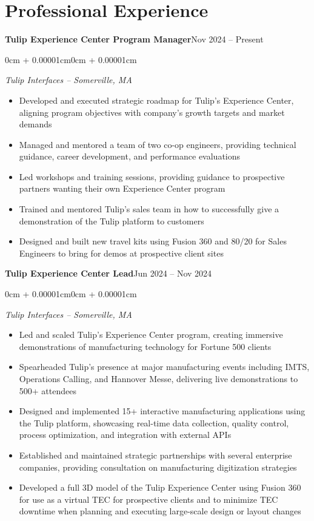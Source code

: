 \documentclass[10pt, letterpaper]{article}
\newenvironment{highlights}{
    \begin{itemize}[
        leftmargin=0.5cm,
        rightmargin=0cm,
        itemindent=0cm,
        labelwidth=0.3cm,
        labelsep=0.2cm,
        align=left,
        itemsep=0.05cm,
        topsep=0.05cm,
        parsep=0.05cm,
        partopsep=0pt
    ]
}{
    \end{itemize}
    \vspace{0.1cm}
}
\newenvironment{onecolentry}{
    \begin{adjustwidth}{0cm + 0.00001cm}{0cm + 0.00001cm}
}{
    \end{adjustwidth}
}
\begin{document}
    \section{Professional Experience}
    \begin{twocolentry}{\textbf{Tulip Experience Center Program Manager}}{Nov 2024 -- Present}
    \end{twocolentry}
    \begin{onecolentry}
    \textit{Tulip Interfaces -- Somerville, MA}
    \begin{highlights}
        \item Developed and executed strategic roadmap for Tulip's Experience Center, aligning program objectives with company's growth targets and market demands
        \item Managed and mentored a team of two co-op engineers, providing technical guidance, career development, and performance evaluations
        \item Led workshops and training sessions, providing guidance to prospective partners wanting their own Experience Center program
        \item Trained and mentored Tulip's sales team in how to successfully give a demonstration of the Tulip platform to customers
        \item Designed and built new travel kits using Fusion 360 and 80/20 for Sales Engineers to bring for demos at prospective client sites
    \end{highlights}
    \end{onecolentry}

    \begin{twocolentry}{\textbf{Tulip Experience Center Lead}}{Jun 2024 -- Nov 2024}
    \end{twocolentry}
    \begin{onecolentry}
    \textit{Tulip Interfaces -- Somerville, MA}
    \begin{highlights}
        \item Led and scaled Tulip's Experience Center program, creating immersive demonstrations of manufacturing technology for Fortune 500 clients
        \item Spearheaded Tulip's presence at major manufacturing events including IMTS, Operations Calling, and Hannover Messe, delivering live demonstrations to 500+ attendees
        \item Designed and implemented 15+ interactive manufacturing applications using the Tulip platform, showcasing real-time data collection, quality control, process optimization, and integration with external APIs
        \item Established and maintained strategic partnerships with several enterprise companies, providing consultation on manufacturing digitization strategies
        \item Developed a full 3D model of the Tulip Experience Center using Fusion 360 for use as a virtual TEC for prospective clients and to minimize TEC downtime when planning and executing large-scale design or layout changes
    \end{highlights}
    \end{onecolentry}
\end{document}
